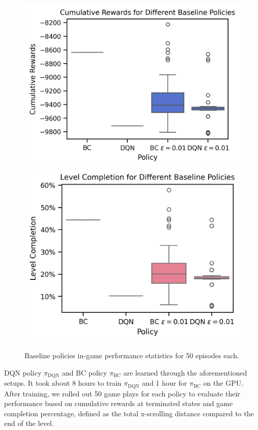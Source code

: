 \documentclass{article}
\begin{document}
\begin{figure}[htbp]
      \centering
      \includegraphics[width=0.8\columnwidth]{figures/cum_rewards_baseline.png}
      \vspace{0.5cm} %
      \includegraphics[width=0.8\columnwidth]{figures/completions_baseline.png}
      \caption{Baseline policies in-game performance statistics for 50 episodes each.}
      \label{fig:baseline_policies}
\end{figure}

DQN policy $\pi_{\text{DQN}}$ and BC policy $\pi_{\text{BC}}$ are learned 
through the aforementioned setups. It took about 8 hours to train 
$\pi_{\text{DQN}}$ and 1 hour for $\pi_{\text{BC}}$ on the GPU. After training, 
we rolled out 50 game plays for each policy to evaluate their performance based 
on cumulative rewards at terminated states and game completion percentage, 
defined as the total x-scrolling distance compared to the end of the level. 
\end{document}
